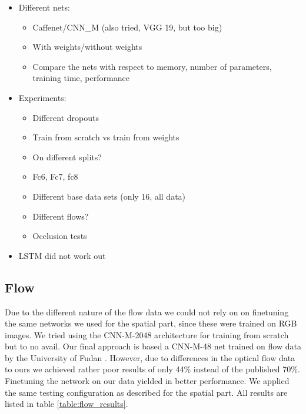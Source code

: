 \begin{itemize}
	\item
		Different nets:
		\begin{itemize}
			\item Caffenet/CNN\_M (also tried, VGG 19, but too big)
			\item With weights/without weights
			\item Compare the nets with respect to memory, number of parameters, training time, performance
		\end{itemize}
	\item
		Experiments:
		\begin{itemize}
			\item Different dropouts
			\item Train from scratch vs train from weights
			\item On different splits?
			\item Fc6, Fc7, fc8
			\item Different base data sets (only 16, all data)
			\item Different flows?
			\item Occlusion tests
		\end{itemize}
	\item
		LSTM did not work out
\end{itemize}


\subsection{Flow}
\label{subsec:flow}
Due to the different nature of the flow data we could not rely on on finetuning the same networks we used for the spatial part, since these were trained on RGB images. We tried using the CNN-M-2048 architecture for training from scratch but to no avail. Our final approach is based a CNN-M-48 net trained on flow data by the University of Fudan \cite{wu2015modeling}. However, due to differences in the optical flow data to ours we achieved rather poor results of only 44\% instead of the published 70\%.  Finetuning the network on our data yielded in better performance. We applied the same testing configuration as described for the spatial part. All results are listed in table \ref{table:flow_results}.

